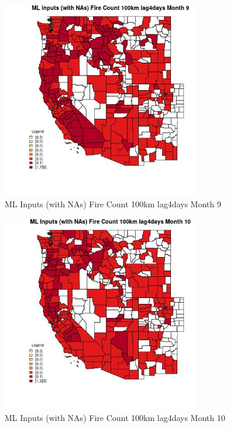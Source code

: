 \begin{figure} 
\centering  
\includegraphics[width=0.77\textwidth]{Code_Outputs/Report_ML_input_PM25_Step4_part_e_de_duplicated_aves_compiled_2019-05-21wNAs_CountyFire_Count_100km_lag4daysmedianMonth9.jpg} 
\caption{\label{fig:Report_ML_input_PM25_Step4_part_e_de_duplicated_aves_compiled_2019-05-21wNAsCountyFire_Count_100km_lag4daysmedianMonth9}ML Inputs (with NAs) Fire Count 100km lag4days Month 9} 
\end{figure} 
 

\begin{figure} 
\centering  
\includegraphics[width=0.77\textwidth]{Code_Outputs/Report_ML_input_PM25_Step4_part_e_de_duplicated_aves_compiled_2019-05-21wNAs_CountyFire_Count_100km_lag4daysmedianMonth10.jpg} 
\caption{\label{fig:Report_ML_input_PM25_Step4_part_e_de_duplicated_aves_compiled_2019-05-21wNAsCountyFire_Count_100km_lag4daysmedianMonth10}ML Inputs (with NAs) Fire Count 100km lag4days Month 10} 
\end{figure} 
 

